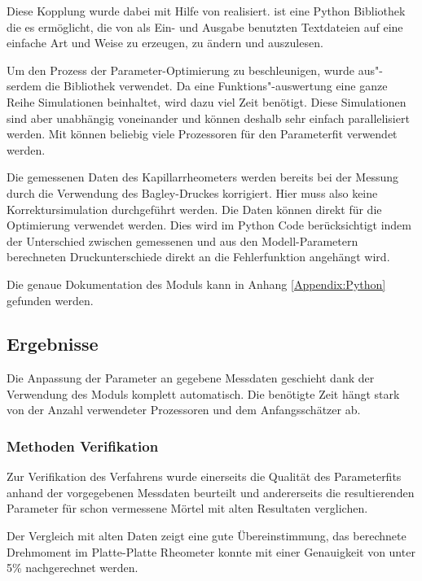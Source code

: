 Diese Kopplung wurde dabei mit Hilfe von  \cite{pyfoam} realisiert.  ist eine Python Bibliothek die es ermöglicht, die von \openfoam{} als Ein- und Ausgabe benutzten Textdateien auf eine einfache Art und Weise zu erzeugen, zu ändern und auszulesen.

Um den Prozess der Parameter-Optimierung zu beschleunigen, wurde aus"-serdem die Bibliothek  \cite{parallelpython} verwendet. Da eine Funktions"-auswertung eine ganze Reihe Simulationen beinhaltet, wird dazu viel Zeit benötigt. Diese Simulationen sind aber unabhängig voneinander und können deshalb sehr einfach parallelisiert werden. Mit  können beliebig viele Prozessoren für den Parameterfit verwendet werden.

Die gemessenen Daten des Kapillarrheometers werden bereits bei der Messung durch die Verwendung des Bagley-Druckes korrigiert. Hier muss also keine Korrektursimulation durchgeführt werden. Die Daten können direkt für die Optimierung verwendet werden. Dies wird im Python Code berücksichtigt indem der Unterschied zwischen gemessenen und aus den Modell-Parametern berechneten Druckunterschiede direkt an die Fehlerfunktion angehängt wird.

Die genaue Dokumentation des Moduls kann in Anhang \ref{Appendix:Python} gefunden werden.
%
\subsection{Ergebnisse}
Die Anpassung der Parameter an gegebene Messdaten geschieht dank der Verwendung des  Moduls komplett automatisch. 
Die benötigte Zeit hängt stark von der Anzahl verwendeter Prozessoren und dem Anfangsschätzer ab.
%
\subsubsection{Methoden Verifikation}
Zur Verifikation des Verfahrens wurde einerseits die Qualität des Parameterfits anhand der vorgegebenen Messdaten beurteilt und andererseits die resultierenden Parameter für schon vermessene Mörtel mit alten Resultaten verglichen.

Der Vergleich mit alten Daten zeigt eine gute Übereinstimmung, das berechnete Drehmoment im Platte-Platte Rheometer konnte mit einer Genauigkeit von unter 5\% nachgerechnet werden.

